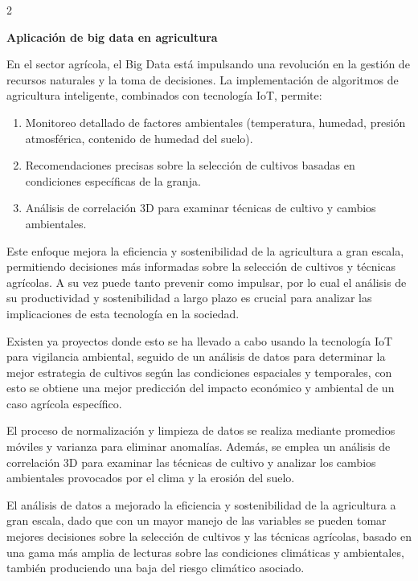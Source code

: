 \documentclass[12pt,spanish,Letterpaper,openany]{book}
\begin{document}
\begin {multicols}{2}
\bigskip
\bigskip
\bigskip
\bigskip

\textbf{Aplicación de big data en agricultura}

En el sector agrícola, el Big Data está impulsando una revolución en la gestión de recursos naturales y la toma de decisiones. La implementación de algoritmos de agricultura inteligente, combinados con tecnología IoT, permite:

\begin{enumerate}
\def\labelenumi{\arabic{enumi}.}
\item
  Monitoreo detallado de factores ambientales (temperatura, humedad, presión atmosférica, contenido de humedad del suelo).
\item
  Recomendaciones precisas sobre la selección de cultivos basadas en condiciones específicas de la granja.
\item
  Análisis de correlación 3D para examinar técnicas de cultivo y cambios ambientales.
\end{enumerate}

Este enfoque mejora la eficiencia y sostenibilidad de la agricultura a gran escala, permitiendo decisiones más informadas sobre la selección de cultivos y técnicas agrícolas. A su vez puede tanto prevenir como impulsar, por lo cual el análisis de su productividad y sostenibilidad a largo plazo es crucial para analizar las implicaciones de esta tecnología en la sociedad.

Existen ya proyectos donde esto se ha llevado a cabo usando la tecnología IoT para vigilancia ambiental, seguido de un análisis de datos para determinar la mejor estrategia de cultivos según las condiciones espaciales y temporales, con esto se obtiene una mejor predicción del impacto económico y ambiental de un caso agrícola específico.

El proceso de normalización y limpieza de datos se realiza mediante promedios móviles y varianza para eliminar anomalías. Además, se emplea un análisis de correlación 3D para examinar las técnicas de cultivo y analizar los cambios ambientales provocados por el clima y la erosión del suelo.

El análisis de datos a mejorado la eficiencia y sostenibilidad de la agricultura a gran escala, dado que con un mayor manejo de las variables se pueden tomar mejores decisiones sobre la selección de cultivos y las técnicas agrícolas, basado en una gama más amplia de lecturas sobre las condiciones climáticas y ambientales, también produciendo una baja del riesgo climático asociado.


\end{multicols}
\end{document}
